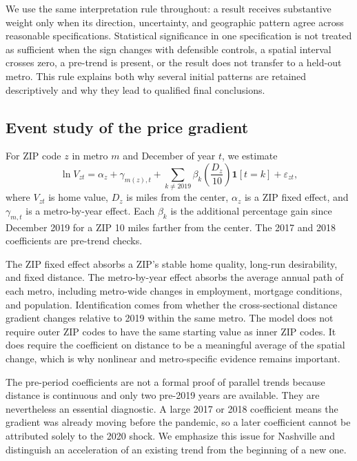 \documentclass[11pt]{article}
\begin{document}
We use the same interpretation rule throughout: a result receives substantive weight only when its direction, uncertainty, and
geographic pattern agree across reasonable specifications. Statistical significance in one specification is not treated as
sufficient when the sign changes with defensible controls, a spatial interval crosses zero, a pre-trend is present, or the result
does not transfer to a held-out metro. This rule explains both why several initial patterns are retained descriptively and why they
lead to qualified final conclusions.

\subsection{Event study of the price gradient}
\label{sec:event}

For ZIP code $z$ in metro $m$ and December of year $t$, we estimate
\begin{equation}
\ln V_{zt}=\alpha_z+\gamma_{m(z),t}+\sum_{k\ne2019}\beta_k
\left(\frac{D_z}{10}\right)\mathbf{1}[t=k]+\varepsilon_{zt},
\label{eq:event}
\end{equation}
where $V_{zt}$ is home value, $D_z$ is miles from the center, $\alpha_z$ is a ZIP fixed effect, and $\gamma_{m,t}$ is a
metro-by-year effect. Each $\beta_k$ is the additional percentage gain since December 2019 for a ZIP 10 miles farther from the
center. The 2017 and 2018 coefficients are pre-trend checks.

The ZIP fixed effect absorbs a ZIP's stable home quality, long-run desirability, and fixed distance. The metro-by-year effect
absorbs the average annual path of each metro, including metro-wide changes in employment, mortgage conditions, and population.
Identification comes from whether the cross-sectional distance gradient changes relative to 2019 within the same metro. The model
does not require outer ZIP codes to have the same starting value as inner ZIP codes. It does require the coefficient on distance to
be a meaningful average of the spatial change, which is why nonlinear and metro-specific evidence remains important.

The pre-period coefficients are not a formal proof of parallel trends because distance is continuous and only two pre-2019 years
are available. They are nevertheless an essential diagnostic. A large 2017 or 2018 coefficient means the gradient was already
moving before the pandemic, so a later coefficient cannot be attributed solely to the 2020 shock. We emphasize this issue for
Nashville and distinguish an acceleration of an existing trend from the beginning of a new one.
\end{document}
